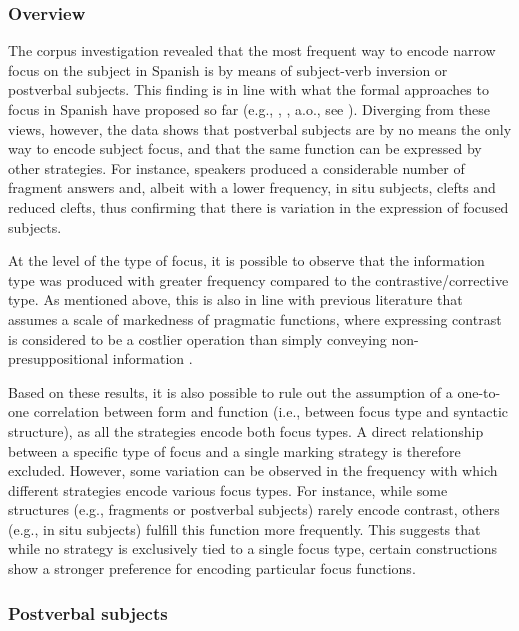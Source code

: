 \subsubsection{Overview} \label{sub:4.5.1.1}
The corpus investigation revealed that the most frequent way to encode narrow focus on the subject in Spanish is by means of subject-verb inversion or postverbal subjects. This finding is in line with what the formal approaches to focus in Spanish have proposed so far (e.g., \cite{zubizarreta1998prosody}, \cite{gutierrez2013structural}, a.o., see ). Diverging from these views, however, the data shows that postverbal subjects are by no means the only way to encode subject focus, and that the same function can be expressed by other strategies. For instance, speakers produced a considerable number of fragment answers and, albeit with a lower frequency, in situ subjects, clefts and reduced clefts, thus confirming that there is variation in the expression of focused subjects.

At the level of the type of focus, it is possible to observe that the information type was produced with greater frequency compared to the contrastive/corrective type. As mentioned above, this is also in line with previous literature that assumes a scale of markedness of pragmatic functions, where expressing contrast is considered to be a costlier operation than simply conveying non-presuppositional information \parencite{zimmermann2008contrastive, skopeteas2010focus}.

Based on these results, it is also possible to rule out the assumption of a one-to-one correlation between form and function (i.e., between focus type and syntactic structure), as all the strategies encode both focus types. A direct relationship between a specific type of focus and a single marking strategy is therefore excluded.
However, some variation can be observed in the frequency with which different strategies encode various focus types. For instance, while some structures (e.g., fragments or postverbal subjects) rarely encode contrast, others (e.g., in situ subjects) fulfill this function more frequently. This suggests that while no strategy is exclusively tied to a single focus type, certain constructions show a stronger preference for encoding particular focus functions.

\subsubsection{Postverbal subjects} \label{sub:4.5.1.2}

